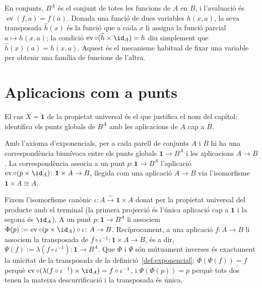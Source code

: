 \begin{observacio}\label{obs:exponencial-classica}
En conjunts, \(B^A\) és el conjunt de totes les funcions de \(A\) en
\(B\), i l'avaluació és \(\operatorname{ev}(f,a)=f(a)\). Donada una funció
de dues variables \(h(x,a)\), la seva transposada \(\widehat h(x)\) és la
funció que a cada \(x\) li assigna la funció parcial
\(a\mapsto h(x,a)\); la condició
\(\operatorname{ev}\circ(\widehat h\times\id_A)=h\) diu simplement que
\(\widehat h(x)(a)=h(x,a)\). Aquest és el mecanisme habitual de fixar una
variable per obtenir una família de funcions de l'altra.
\end{observacio}

\section{Aplicacions com a punts}\label{sec:aplicacions-punts}

El cas \(X=\mathbf1\) de la propietat universal és el que justifica el
nom del capítol: identifica els punts globals de \(B^A\) amb les
aplicacions de \(A\) cap a \(B\).

\begin{teorema}\label{teo:punts-exponencial}
Amb l'axioma d'exponencials, per a cada parell de conjunts \(A\) i \(B\)
hi ha una correspondència biunívoca entre els punts globals
\(\mathbf1\to B^A\) i les aplicacions \(A\to B\). La correspondència
associa a un punt \(p\colon\mathbf1\to B^A\) l'aplicació
\(\operatorname{ev}\circ(p\times\id_A)\colon\mathbf1\times A\to B\), llegida
com una aplicació \(A\to B\) via l'isomorfisme
\(\mathbf1\times A\cong A\).
\end{teorema}

\begin{prova}
Fixem l'isomorfisme canònic \(\iota\colon A\xrightarrow{\sim}\mathbf1\times
A\) donat per la propietat universal del producte amb el terminal
(la primera projecció és l'única aplicació cap a \(\mathbf1\) i la segona
és \(\id_A\)). A un punt \(p\colon\mathbf1\to B^A\) li associem
\(\Phi(p):=\operatorname{ev}\circ(p\times\id_A)\circ\iota\colon A\to B\).
Recíprocament, a una aplicació \(f\colon A\to B\) li associem la
transposada de \(f\circ\iota^{-1}\colon\mathbf1\times A\to B\), és a dir,
\(\Psi(f):=\lambda(f\circ\iota^{-1})\colon\mathbf1\to B^A\). Que \(\Phi\) i
\(\Psi\) són mútuament inverses és exactament la unicitat de la transposada
de la definició~\ref{def:exponencial}: \(\Phi(\Psi(f))=f\) perquè
\(\operatorname{ev}\circ(\lambda(f\circ\iota^{-1})\times\id_A)=f\circ\iota^{-1}\),
i \(\Psi(\Phi(p))=p\) perquè tots dos tenen la mateixa descurrificació i la
transposada és única.
\end{prova}

